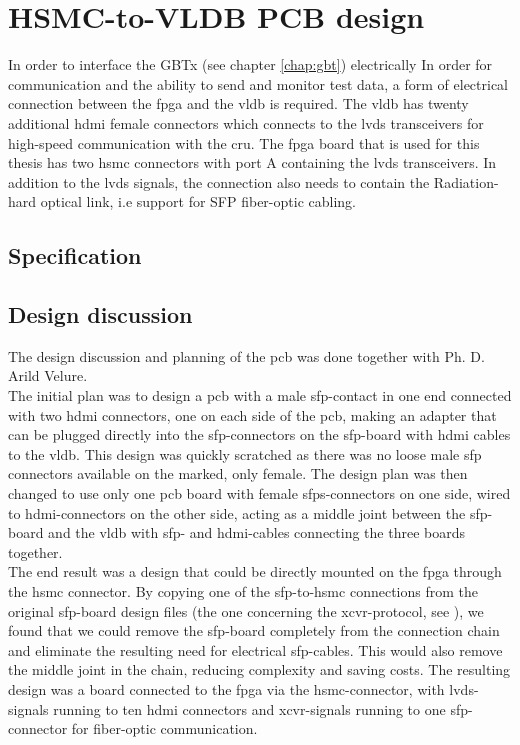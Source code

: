 \documentclass[main.tex]{subfiles}
\begin{document}
\chapter{HSMC-to-VLDB PCB design} \label{chap:pcb}

In order to interface the GBTx (see chapter \ref{chap:gbt}) electrically
In order for communication and the ability to send and monitor test data, a form of electrical connection between the \gls{fpga} and the \gls{vldb} is required. The \gls{vldb} has twenty additional \acrshort{hdmi} female connectors which connects to the \gls{lvds} transceivers for high-speed communication with the \gls{cru}. The \gls{fpga} board that is used for this thesis has two \gls{hsmc} connectors with port A containing the \gls{lvds} transceivers. In addition to the \gls{lvds} signals, the connection also needs to contain the Radiation-hard optical link, i.e support for SFP fiber-optic cabling.\\

\section{Specification}



\section{Design discussion}

The design discussion and planning of the \gls{pcb} was done together with Ph. D. Arild Velure.\\

The initial plan was to design a \gls{pcb} with a male \gls{sfp}-contact in one end connected with two \gls{hdmi} connectors, one on each side of the \gls{pcb}, making an adapter that can be plugged directly into the \gls{sfp}-connectors on the \gls{sfp}-board with \gls{hdmi} cables to the \gls{vldb}. This design was quickly scratched as there was no loose male \gls{sfp} connectors available on the marked, only female. The design plan was then changed to use only one \gls{pcb} board with female \glspl{sfp}-connectors on one side, wired to \gls{hdmi}-connectors on the other side, acting as a middle joint between the \gls{sfp}-board and the \gls{vldb} with \gls{sfp}- and \gls{hdmi}-cables connecting the three boards together. \\

The end result was a design that could be directly mounted on the \gls{fpga} through the \gls{hsmc} connector. By copying one of the \gls{sfp}-to-\gls{hsmc} connections from the original \gls{sfp}-board design files (the one concerning the \gls{xcvr}-protocol, see \cite{sfp_schem}), we found that we could remove the \gls{sfp}-board completely from the connection chain and eliminate the resulting need for electrical \gls{sfp}-cables. This would also remove the middle joint in the chain, reducing complexity and saving costs. The resulting design was a board connected to the \gls{fpga} via the \gls{hsmc}-connector, with \gls{lvds}-signals running to ten \gls{hdmi} connectors and \gls{xcvr}-signals running to one \gls{sfp}-connector for fiber-optic communication.
\end{document}
